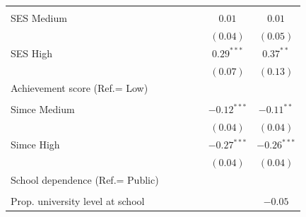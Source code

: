 \documentclass[
  12pt,
  letterpaper,
]{article}
\begin{document}
\begin{table}
{\begin{center}
{\begin{threeparttable}
\begin{tabular}{l c c c c c c}
                                                       &              &               &               &               &               &               \\
\quad SES Medium                                       &              &               &               &               & $0.01$        & $0.01$        \\
                                                       &              &               &               &               & $(0.04)$      & $(0.05)$      \\
\quad SES High                                         &              &               &               &               & $0.29^{***}$  & $0.37^{**}$   \\
                                                       &              &               &               &               & $(0.07)$      & $(0.13)$      \\
Achievement score (Ref.= Low)                          &              &               &               &               &               &               \\
                                                       &              &               &               &               &               &               \\
\quad Simce Medium                                     &              &               &               &               & $-0.12^{***}$ & $-0.11^{**}$  \\
                                                       &              &               &               &               & $(0.04)$      & $(0.04)$      \\
\quad Simce High                                       &              &               &               &               & $-0.27^{***}$ & $-0.26^{***}$ \\
                                                       &              &               &               &               & $(0.04)$      & $(0.04)$      \\
School dependence (Ref.= Public)                       &              &               &               &               &               &               \\
                                                       &              &               &               &               &               &               \\
\quad Prop. university level at school                 &              &               &               &               &               & $-0.05$       \\

\end{tabular}
\end{threeparttable}}
\end{center}}
\end{table}
\end{document}
